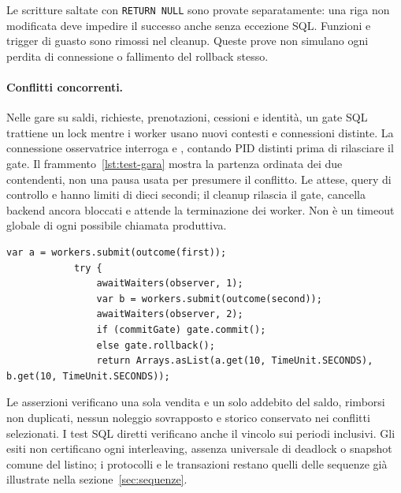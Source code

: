 Le scritture saltate con \texttt{RETURN NULL} sono provate separatamente:
una riga non modificata deve impedire il successo anche senza eccezione
SQL. Funzioni e trigger di guasto sono rimossi nel cleanup. Queste prove
non simulano ogni perdita di connessione o fallimento del rollback stesso.

\paragraph{Conflitti concorrenti.}
Nelle gare su saldi, richieste, prenotazioni, cessioni e identità, un gate
SQL trattiene un lock mentre i worker usano nuovi contesti e connessioni
distinte. La connessione osservatrice interroga 
e , contando PID distinti prima di rilasciare il gate.
Il frammento~\ref{lst:test-gara} mostra la partenza ordinata dei due
contendenti, non una pausa usata per presumere il conflitto.
Le attese, query di controllo e  hanno limiti di dieci
secondi; il cleanup rilascia il gate, cancella backend ancora bloccati
e attende la terminazione dei worker. Non è un timeout globale di ogni
possibile chiamata produttiva.

\noindent\begin{minipage}{\linewidth}
\begin{lstlisting}[firstnumber=301,caption={\code{PurchaseConcurrencyIntegrationTest.java}: estratto della prova.},label=lst:test-gara]
            var a = workers.submit(outcome(first));
            try {
                awaitWaiters(observer, 1);
                var b = workers.submit(outcome(second));
                awaitWaiters(observer, 2);
                if (commitGate) gate.commit();
                else gate.rollback();
                return Arrays.asList(a.get(10, TimeUnit.SECONDS), b.get(10, TimeUnit.SECONDS));
\end{lstlisting}
\end{minipage}

Le asserzioni verificano una sola vendita e un solo addebito del saldo,
rimborsi non duplicati, nessun noleggio sovrapposto e storico conservato
nei conflitti selezionati. I test SQL diretti verificano anche il vincolo
 sui periodi inclusivi. Gli esiti non certificano ogni
interleaving, assenza universale di deadlock o snapshot comune del listino;
i protocolli e le transazioni restano quelli delle sequenze già illustrate
nella sezione~\ref{sec:sequenze}.

